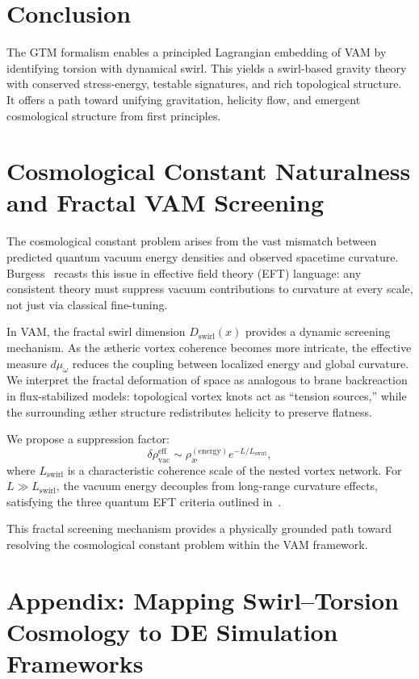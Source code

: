 \documentclass[11pt]{article}
\begin{document}
        \section{Conclusion}

        The GTM formalism enables a principled Lagrangian embedding of VAM by identifying torsion with dynamical swirl. This yields a swirl-based gravity theory with conserved stress-energy, testable signatures, and rich topological structure. It offers a path toward unifying gravitation, helicity flow, and emergent cosmological structure from first principles.

    \appendix
    \section{Cosmological Constant Naturalness and Fractal VAM Screening}

    The cosmological constant problem arises from the vast mismatch between predicted quantum vacuum energy densities and observed spacetime curvature. Burgess~\cite{burgessCCProblem} recasts this issue in effective field theory (EFT) language: any consistent theory must suppress vacuum contributions to curvature at every scale, not just via classical fine-tuning.

    In VAM, the fractal swirl dimension \( D_\text{swirl}(x) \) provides a dynamic screening mechanism. As the ætheric vortex coherence becomes more intricate, the effective measure \( d\mu_\omega \) reduces the coupling between localized energy and global curvature. We interpret the fractal deformation of space as analogous to brane backreaction in flux-stabilized models: topological vortex knots act as ``tension sources,'' while the surrounding æther structure redistributes helicity to preserve flatness.

    We propose a suppression factor:
    \[
        \delta \rho_\text{vac}^{\text{eff}} \sim \rho_\text{\ae}^{(\text{energy})} e^{-L / L_\text{swirl}},
    \]
    where \( L_\text{swirl} \) is a characteristic coherence scale of the nested vortex network. For \( L \gg L_\text{swirl} \), the vacuum energy decouples from long-range curvature effects, satisfying the three quantum EFT criteria outlined in~\cite{burgessCCProblem}.

    This fractal screening mechanism provides a physically grounded path toward resolving the cosmological constant problem within the VAM framework.

    \appendix
    \section*{Appendix: Mapping Swirl–Torsion Cosmology to DE Simulation Frameworks}
\end{document}
